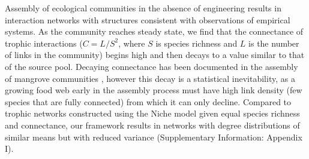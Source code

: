 \documentclass[9pt,twocolumn,twoside]{pnas-new}
\newcommand{\rr}[1]{{\rm #1}}
\begin{document}
Assembly of ecological communities in the absence of engineering results in interaction networks with structures consistent with observations of empirical systems.
As the community reaches steady state, we find that the connectance of trophic interactions ($C=L/S^2$, where $S$ is species richness and $L$ is the number of links in the community) begins high and then decays to a value similar to that of the source pool.
Decaying connectance has been documented in the assembly of mangrove communities \cite{Piechnik2008}, however this decay is a statistical inevitability, as a growing food web early in the assembly process must have high link density (few species that are fully connected) from which it can only decline.
Compared to trophic networks constructed using the Niche model \cite{Williams2000} given equal species richness and connectance, our framework results in networks with degree distributions of similar means but with reduced variance (Supplementary Information: Appendix I).

% 
\end{document}
